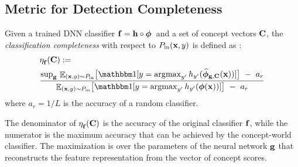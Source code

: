 \subsection{Metric for Detection Completeness}
\label{sec:completeness_score}
%
%
%
\begin{definition}
\label{def:completeness_class}
Given a trained DNN classifier $\mathbf{f} = \mathbf{h} \circ \bm{\phi}\,$ and a set of concept vectors $\mathbf{C}$, the {\em classification completeness} with respect to $P_{\textrm{in}}(\mathbf{x}, y)$ is defined as \citep{yeh2020completeness}:
\begin{align*}
    &\eta^{}_\bff(\bfC) := \\
    &\frac{\textrm{sup}_\bfg \,\expec_{(\bfx, y) \sim \Pin} \!\big[ \indicator[ y = \argmax_{y'} h_{y'}(\recphi(\bfx)) ] \big] ~-~ a_r}{\expec_{(\bfx, y) \sim \Pin} \!\big[ \indicator[y = \argmax_{y'} h_{y'}(\bfphi(\bfx))] \big] ~-~ a_r}
\end{align*}
where $a_r = 1 / L$ is the accuracy of a random classifier.
\end{definition}
The denominator of $\eta^{}_{\mathbf{f}}(\mathbf{C})$ is the accuracy of the original classifier $\mathbf{f}$, while the numerator is the maximum accuracy that can be achieved by the concept-world classifier.
The maximization is over the parameters of the neural network $\mathbf{g}$ that reconstructs the feature representation from the vector of concept scores.

